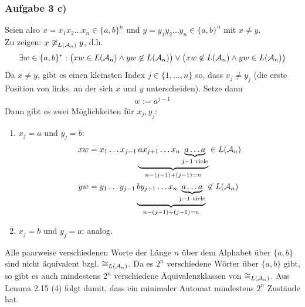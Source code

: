 \subsubsection{Aufgabe 3 c)}
Seien also $x=x_1 x_2\hdots x_n\in\lbrace a,b\rbrace^n$ und $y=y_1 y_2\hdots y_n\in\lbrace a,b\rbrace^n$ mit $x\neq y$.\\
Zu zeigen: $x\not\cong_{L(\mathcal{A}_n)} y$, d.h.
\begin{align*}
	\exists w\in\lbrace a,b\rbrace^\ast:\big(xw\in L(\mathcal{A}_n)\wedge yw\not\in L(\mathcal{A}_n)\big)\vee\big(xw\not\in L(\mathcal{A}_n)\wedge yw\in L(\mathcal{A}_n)\big)
\end{align*}
Da $x\neq y$, gibt es einen kleinsten Index $j\in\lbrace1,\ldots,n\rbrace$ so, dass $x_j\neq y_j$ (die erste Position von links, an der sich $x$ und $y$ unterscheiden). 
Setze dann 
\begin{align*}
	w:=a^{j-1}
\end{align*}
Dann gibt es zwei Möglichkeiten für $x_j,y_j$:
\begin{enumerate}
	\item $x_j=a$ und $y_j=b$:
	\begin{align*}
		xw&=x_1\hdots x_{j-1}\underbrace{ a x_{j+1}\hdots x_n\underbrace{a\hdots a}_{j-1\text{ viele}}}_{n-(j-1)+(j-1)=n}\in L(\mathcal{A}_n)\\
		yw&=y_1\hdots y_{j-1}\underbrace{ b y_{j+1}\hdots x_n\underbrace{a\hdots a}_{j-1\text{ viele}}}_{n-(j-1)+(j-1)=n}\not\in L(\mathcal{A}_n)
	\end{align*}
	\item $x_j=b$ und $y_j=a$: analog.
\end{enumerate}

Alle paarweise verschiedenen Worte der Länge $n$ über dem Alphabet über $\lbrace a,b\rbrace$ sind nicht äquivalent bzgl. $\cong_{L(\mathcal{A}_n)}$. Da es $2^n$ verschiedene Wörter über $\lbrace a,b\rbrace$ gibt, so gibt es auch mindestens $2^n$ verschiedene Äquivalenzklassen von $\cong_{L(\mathcal{A}_n)}$. Aus Lemma 2.15 (4) folgt damit, dass ein minimaler Automat mindestens $2^n$ Zustände hat.
